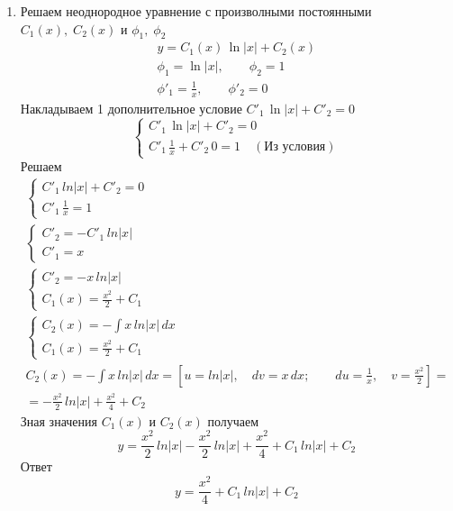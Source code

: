 \begin{Example}
\begin{enumerate}
        \item Решаем неоднородное уравнение с произволными постоянными $C_1(x),\; C_2(x)$ и $\phi_1,\; \phi_2$
        \begin{gather*}
            y = C_1(x)\,\ln|x| + C_2(x)\\
            \phi_1 = \ln|x|, \qquad \phi_2 = 1\\
            \phi'_1 = \frac{1}{x}, \qquad \phi'_2 = 0
        \end{gather*} 
        Накладываем 1 дополнительное условие $C'_1\,\ln|x| + C'_2 = 0$\\
        \[
            \begin{cases}
                C'_1\,\ln|x| + C'_2 = 0\\
                C'_1\,\frac{1}{x} + C'_2\,0 = 1 \quad (\text{Из условия})
            \end{cases}
        \]
        Решаем
        \begin{gather*}
            \begin{cases}  
                C'_1\,ln|x| + C'_2 = 0\\
                C'_1\,\frac{1}{x} = 1
            \end{cases}\\
            \begin{cases}  
            C'_2 = - C'_1\,ln|x|\\
            C'_1 = x
            \end{cases}\\
            \begin{cases}  
            C'_2 = - x\,ln|x|\\
            C_1(x) = \frac{x^2}{2} + C_1
            \end{cases}\\
            \begin{cases}  
            C_2(x) = -\int x\,ln|x|\,dx\\
            C_1(x) = \frac{x^2}{2} + C_1
            \end{cases}\\
            C_2(x) = -\int x\,ln|x|\,dx = \left[u = ln|x|, \quad dv = x\,dx; \qquad du = \frac{1}{x}, \quad v = \frac{x^2}{2}\right] = \\
            = - \frac{x^2}{2}\,ln|x| + \frac{x^2}{4} + C_2
        \end{gather*}
        Зная значения $C_1(x)$ и $C_2(x)$ получаем
        \[
            y = \frac{x^2}{2}\,ln|x| - \frac{x^2}{2}\,ln|x| + \frac{x^2}{4} + C_1\,ln|x| + C_2
        \]
        Ответ
        \[
            y = \frac{x^2}{4} + C_1\,ln|x| + C_2
        \]
    \end{enumerate}
\end{Example}